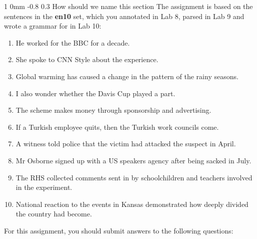 \documentclass[11pt]{article}
\makeatletter
\renewcommand{\section}{\@startsection
{section}%
{1}%
{0mm}%
{-0.8\baselineskip}%
{0.3\baselineskip}%
{\bfseries\large}}%
\makeatother
\begin{document}
\section{How should we name this section}
\noindent
The assignment is based on the sentences in
the \textbf{en10} set, which you annotated in Lab 8, parsed in Lab 9
and wrote a grammar for in Lab 10:
\begin{enumerate}[noitemsep]
\item He worked for the BBC for a decade.
\item She spoke to CNN Style about the experience.
\item Global warming has caused a change in the pattern of the rainy seasons.
\item I also wonder whether the Davis Cup played a part.
\item The scheme makes money through sponsorship and advertising.
\item If a Turkish employee quits, then the Turkish work councils come.
\item A witness told police that the victim had attacked the suspect in April.
\item Mr Osborne signed up with a US speakers agency after being sacked in July.
\item The RHS collected comments sent in by schoolchildren and teachers involved in the experiment.
\item National reaction to the events in Kansas demonstrated how deeply divided the country had become.
\end{enumerate}
For this assignment, you should submit answers to the following questions:
\end{document}
